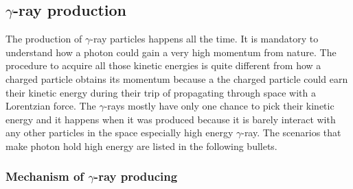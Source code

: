 \subsection{$\gamma$-ray production}

The production of $\gamma$-ray particles happens all the 
time. It is mandatory to understand how a photon could 
gain a very high momentum from nature. The procedure 
to acquire all those kinetic energies is quite different from how
a charged particle obtains its momentum because a 
the charged particle could earn their kinetic energy during 
 their trip of propagating through space with a 
Lorentzian force. The $\gamma$-rays mostly have only one 
chance to pick their kinetic energy and it happens when it 
was produced because it is barely interact with any other 
particles in the space especially high energy $\gamma$-ray.
The scenarios that make photon hold high energy are 
listed in the following bullets.

\subsubsection{Mechanism of $\gamma$-ray producing}

